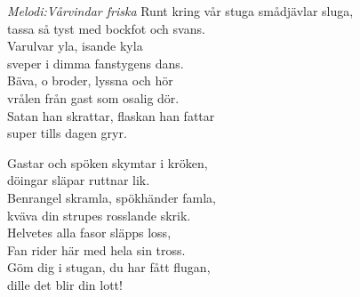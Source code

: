 {\footnotesize\textit{Melodi:Vårvindar friska}}
\vspace{10pt}
Runt kring vår stuga smådjävlar sluga,\\
tassa så tyst med bockfot och svans.\\
Varulvar yla, isande kyla\\
sveper i dimma fanstygens dans.\\
Bäva, o broder, lyssna och hör\\
vrålen från gast som osalig dör.\\
Satan han skrattar, flaskan han fattar\\
super tills dagen gryr.\par
\vspace{10pt}
Gastar och spöken skymtar i kröken,\\
döingar släpar ruttnar lik.\\
Benrangel skramla, spökhänder famla,\\
kväva din strupes rosslande skrik.\\
Helvetes alla fasor släpps loss,\\
Fan rider här med hela sin tross.\\
Göm dig i stugan, du har fått flugan,\\
dille det blir din lott!
